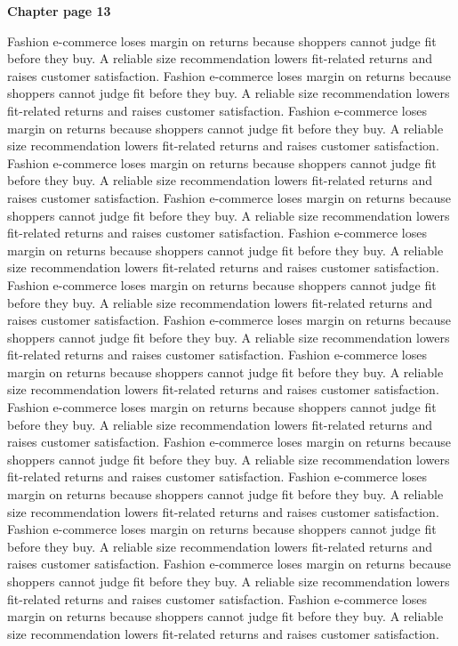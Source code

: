 \documentclass[a4paper,11pt]{article}
\begin{document}
{\headfont\bfseries\Large Chapter page 13}\par\medskip
Fashion e-commerce loses margin on returns because shoppers cannot judge fit before they buy. A reliable size recommendation lowers fit-related returns and raises customer satisfaction. Fashion e-commerce loses margin on returns because shoppers cannot judge fit before they buy. A reliable size recommendation lowers fit-related returns and raises customer satisfaction. Fashion e-commerce loses margin on returns because shoppers cannot judge fit before they buy. A reliable size recommendation lowers fit-related returns and raises customer satisfaction. Fashion e-commerce loses margin on returns because shoppers cannot judge fit before they buy. A reliable size recommendation lowers fit-related returns and raises customer satisfaction. Fashion e-commerce loses margin on returns because shoppers cannot judge fit before they buy. A reliable size recommendation lowers fit-related returns and raises customer satisfaction. 
Fashion e-commerce loses margin on returns because shoppers cannot judge fit before they buy. A reliable size recommendation lowers fit-related returns and raises customer satisfaction. Fashion e-commerce loses margin on returns because shoppers cannot judge fit before they buy. A reliable size recommendation lowers fit-related returns and raises customer satisfaction. Fashion e-commerce loses margin on returns because shoppers cannot judge fit before they buy. A reliable size recommendation lowers fit-related returns and raises customer satisfaction. Fashion e-commerce loses margin on returns because shoppers cannot judge fit before they buy. A reliable size recommendation lowers fit-related returns and raises customer satisfaction. Fashion e-commerce loses margin on returns because shoppers cannot judge fit before they buy. A reliable size recommendation lowers fit-related returns and raises customer satisfaction. 
Fashion e-commerce loses margin on returns because shoppers cannot judge fit before they buy. A reliable size recommendation lowers fit-related returns and raises customer satisfaction. Fashion e-commerce loses margin on returns because shoppers cannot judge fit before they buy. A reliable size recommendation lowers fit-related returns and raises customer satisfaction. Fashion e-commerce loses margin on returns because shoppers cannot judge fit before they buy. A reliable size recommendation lowers fit-related returns and raises customer satisfaction. Fashion e-commerce loses margin on returns because shoppers cannot judge fit before they buy. A reliable size recommendation lowers fit-related returns and raises customer satisfaction. Fashion e-commerce loses margin on returns because shoppers cannot judge fit before they buy. A reliable size recommendation lowers fit-related returns and raises customer satisfaction. \newpage
\end{document}
